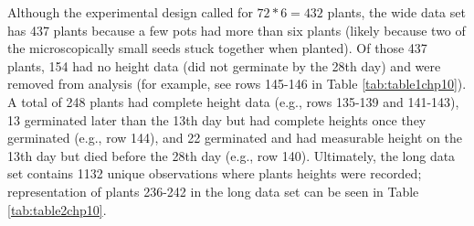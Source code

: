 \documentclass[
]{krantz}
\begin{document}
\begin{table}

\caption{\label{tab:table1chp10}A snapshot of data (Plants 231-246) from the Seed Germination case study in wide format.}
\centering
{}
\end{table}

Although the experimental design called for \(72*6=432\) plants, the wide data set has 437 plants because a few pots had more than six plants (likely because two of the microscopically small seeds stuck together when planted). Of those 437 plants, 154 had no height data (did not germinate by the 28th day) and were removed from analysis (for example, see rows 145-146 in Table \ref{tab:table1chp10}). A total of 248 plants had complete height data (e.g., rows 135-139 and 141-143), 13 germinated later than the 13th day but had complete heights once they germinated (e.g., row 144), and 22 germinated and had measurable height on the 13th day but died before the 28th day (e.g., row 140). Ultimately, the long data set contains 1132 unique observations where plants heights were recorded; representation of plants 236-242 in the long data set can be seen in Table \ref{tab:table2chp10}.
\end{document}
